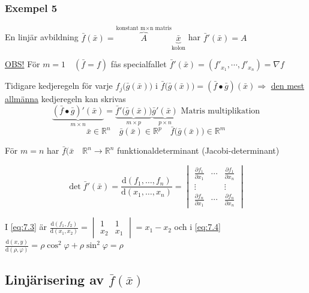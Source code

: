 \documentclass[a4paper]{article}
\begin{document}
\subsubsection{Exempel 5}
En linjär avbildning \(\bar{f}(\bar{x}) = \overbrace{A}^{\text{konstant m}\times\text{n matris}}\underbrace{\bar{x}}_{\text{kolon}}\) har \(\bar{f}'(\bar{x}) = A\)
\newline

\underline{OBS!} För \(m=1 \quad (\bar{f} = f)\) fås specialfallet \(\bar{f}'(\bar{x}) = (f'_{x_1}, \cdots ,f'_{x_n}) = \nabla f\) \newline

Tidigare kedjeregeln för varje \(f_j\big(\bar{g}(\bar{x})\big)\) i \(\bar{f}\big(\bar{g}(\bar{x})\big) = (\bar{f} \bullet \bar{g})(\bar{x}) \Rightarrow\) \underline{den mest allmänna} kedjeregeln kan skrivas
\[
	\underbrace{(\bar{f} \bullet \bar{g})'(\bar{x})}_{m \times n} = \underbrace{\bar{f}'\big(\bar{g}(\bar{x})\big)}_{m \times p}\underbrace{\bar{g}'(\bar{x})}_{p \times n} \text{ Matris multiplikation}
\]
\[
	\bar{x} \in \mathbb{R}^n \quad \bar{g}(\bar{x}) \in \mathbb{R}^p \quad \bar{f}\big(\bar{g}(\bar{x})\big) \in \mathbb{R}^m
\]

För \underline{\(m=n\)} har \(\bar{f}(\bar{x} \quad \mathbb{R}^n \rightarrow \mathbb{R}^n\) funktionaldeterminant (Jacobi-determinant)

\[
	\det\bar{f}'(\bar{x}) = \frac{\mathrm{d}(f_1, \ldots ,f_n)}{\mathrm{d}(x_1, \ldots ,x_n)} = 
	\begin{vmatrix}
		\frac{\partial f_1}{\partial x_1} & \cdots & \frac{\partial f_1}{\partial x_n} \\
		\vdots & & \vdots \\
		\frac{\partial f_n}{\partial x_1} & \cdots & \frac{\partial f_n}{\partial x_n}
	\end{vmatrix}
\]

I \eqref{eq:7.3} är \(\frac{\mathrm{d}(f_1,f_2)}{\mathrm{d}(x_1,x_2)} = 
\begin{vmatrix}
	1 & 1 \\
	x_2 & x_1
\end{vmatrix}
= x_1-x_2\) och i \eqref{eq:7.4} \(\frac{\mathrm{d}(x,y)}{\mathrm{d}(\rho,\varphi)} = \rho\cos^2{\varphi} + \rho\sin^2{\varphi} = \rho\) \label{Rho}

\subsection{Linjärisering av \texorpdfstring{\(\bar{f}(\bar{x})\)}{f(x)}}
\end{document}

